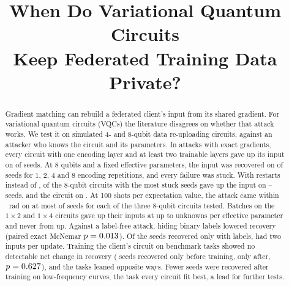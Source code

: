 \documentclass[10pt,conference]{IEEEtran}
\begin{document}
\title{When Do Variational Quantum Circuits\\ Keep Federated Training Data Private?}

\author{
}

\maketitle

\begin{abstract}
Gradient matching can rebuild a federated client's input from its shared gradient. For
variational quantum circuits (VQCs) the literature disagrees on whether that attack works. We test it on simulated 4- and 8-qubit data re-uploading circuits,
against an attacker who knows the circuit and its parameters. In \RqOneAttacks{} attacks with exact gradients, every circuit with one
encoding layer and at least two trainable layers gave up its input on \Seeds{} of \Seeds{} seeds.
At 8 qubits and a fixed \ParamsTopLarge{} effective parameters, the input was recovered on
\RecByRepsLarge{} of \Seeds{} seeds for 1, 2, 4 and 8 encoding repetitions, and every failure was stuck. With
\BudgetRestarts{} restarts instead of \Restarts, \BudgetOthersCount{} of the \BudgetCircuits{}
8-qubit circuits with the most stuck seeds gave up the input on \BudgetOthersMin--\BudgetOthersMax{} seeds, and the
\BudgetHardestCircuit{} circuit on \BudgetHardestRecovered. At 100 shots per expectation value, the attack came within \CloseRad~rad on at most \ShotLowWithinLargeMax{} of
\Seeds{} seeds for each of the three 8-qubit circuits tested. Batches on the $1\times2$ and
$1\times4$ circuits gave up their inputs at up to \BatchLeakMaxRatio{} unknowns per effective
parameter and never from \BatchHeldMinRatio{} up. Against a label-free attack, hiding binary
labels lowered recovery (paired exact McNemar $p = 0.013$). Of the \LabelKnownOnlyAll{}
seeds recovered only with labels, \LabelKnownOnlyTwo{} had two inputs per update. Training the client's circuit on \TrainedTasks{} benchmark tasks showed no detectable net change in
recovery (\TrainedOnlyBeforeAll{} seeds recovered only before training,
\TrainedOnlyAfterAll{} only after, $p = 0.627$), and the tasks leaned opposite ways.
Fewer seeds were recovered after training on low-frequency curves, the task every circuit fit
best, a lead for further tests.
\end{abstract}
\end{document}
